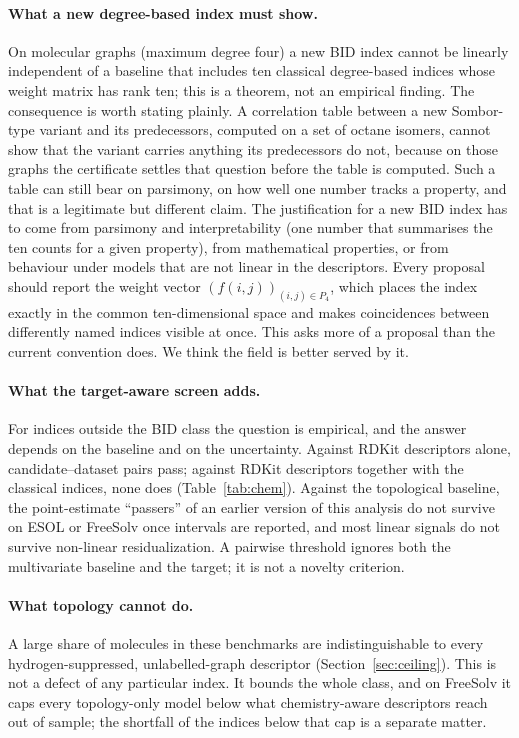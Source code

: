 \documentclass[11pt,a4paper]{article}
\theoremstyle{definition}
\begin{document}
\paragraph{What a new degree-based index must show.} On molecular
graphs (maximum degree four) a new BID index cannot be linearly
independent of a baseline that includes ten classical degree-based
indices whose weight matrix has rank ten; this is a theorem, not an
empirical finding. The
consequence is worth stating plainly. A correlation table between a
new Sombor-type variant and its predecessors, computed on a set of
octane isomers, cannot show that the variant carries anything its
predecessors do not, because on those graphs the certificate settles
that question before the table is computed. Such a table can still
bear on parsimony, on how well one number tracks a property, and that
is a legitimate but different claim. The justification for a new BID
index has to come from parsimony and interpretability (one number that
summarises the ten counts for a given property), from mathematical
properties, or from behaviour under models that are not linear in the
descriptors. Every proposal should report the weight vector
$(f(i,j))_{(i,j)\in P_4}$, which places the index exactly in the
common ten-dimensional space and makes coincidences between
differently named indices visible at once. This asks more of a
proposal than the current convention does. We think the field is
better served by it.

\paragraph{What the target-aware screen adds.} For indices outside
the BID class the question is empirical, and the answer depends on the
baseline and on the uncertainty. Against RDKit descriptors alone,
\chemPassRdTotal{} candidate--dataset pairs pass; against RDKit descriptors
together with the classical indices, none does
(Table~\ref{tab:chem}). Against the
topological baseline, the point-estimate ``passers'' of an earlier
version of this analysis do not survive on ESOL or FreeSolv once
intervals are reported, and most linear signals do not survive
non-linear residualization. A pairwise threshold ignores both the
multivariate baseline and the target; it is not a novelty criterion.

\paragraph{What topology cannot do.} A large share of molecules in
these benchmarks are indistinguishable to every hydrogen-suppressed,
unlabelled-graph descriptor (Section~\ref{sec:ceiling}). This is not a
defect of any particular index. It bounds the whole class, and on
FreeSolv it caps every topology-only model below what chemistry-aware
descriptors reach out of sample; the shortfall of the indices below
that cap is a separate matter.
\end{document}

